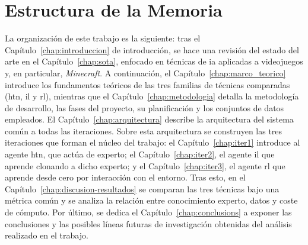 \section{Estructura de la Memoria}
La organización de este trabajo es la siguiente: tras el
Capítulo~\ref{chap:introduccion} de introducción, se hace una revisión del estado del arte en el
Capítulo~\ref{chap:sota}, enfocado en técnicas de \gls{ia} aplicadas a videojuegos y, 
en particular, \textit{Minecraft}. A continuación, el
Capítulo~\ref{chap:marco_teorico} introduce los fundamentos teóricos de las tres familias
de técnicas comparadas (\gls{htn}, \gls{il} y \gls{rl}), mientras que el Capítulo~\ref{chap:metodologia} detalla la metodología de
desarrollo, las fases del proyecto, su planificación y los conjuntos de datos empleados. El
Capítulo~\ref{chap:arquitectura} describe la arquitectura del sistema común a todas las
iteraciones. Sobre esta arquitectura se construyen las tres iteraciones que forman el núcleo del
trabajo: el Capítulo~\ref{chap:iter1} introduce al agente \gls{htn}, que actúa de experto;
el Capítulo~\ref{chap:iter2}, el agente \gls{il} que aprende clonando a dicho experto;
y el Capítulo~\ref{chap:iter3}, el agente \gls{rl} que aprende desde cero por interacción
con el entorno. Tras esto, en el Capítulo~\ref{chap:discusion-resultados} se comparan las tres
técnicas bajo una métrica común y se analiza la relación entre conocimiento experto, datos
y coste de cómputo. Por último, se dedica el Capítulo~\ref{chap:conclusions}
a exponer las conclusiones y las posibles líneas futuras de investigación
obtenidas del análisis realizado en el trabajo.